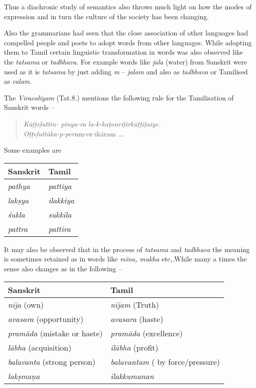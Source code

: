 Thus a diachronic study of semantics also throws much light on how the modes of expression and in turn the culture of the society has been changing.

Also the grammarians had seen that the close association of other languages had compelled people and poets to adopt words from other languages. While adopting them to Tamil certain linguistic transformation in words was also observed like the \textit{tatsama} or \textit{tadbhava}. For example words like \textit{jala} (water) from Sanskrit were used as it is \textit{tatsama} by just adding \textit{m} – \textit{jalam} and also as \textit{tadbhava} or Tamilised as \textit{calam}.

The \textit{Vīracoliyam} (Tat.8.) mentions the following rule for the Tamilisation of Sanskrit words –

\begin{verse}
\textit{Kūṭṭeḻuttin- pinya-ra la-k-kaṭonriṭirkūṭṭiṭaiye.}\\\textit{Oṭṭeḻuttāka-p-per}um-or-ikāram ….
\end{verse}

Some examples are

\begin{longtable}{|l|l|}
\hline
\textbf{Sanskrit} & \textbf{Tamil} \\
\hline
\textit{pathya} & \textit{pattiya} \tabularnewline
\hline
\textit{lakṣya} & \textit{ilakkiya} \tabularnewline
\hline
\textit{śukla} & \textit{sukkila} \tabularnewline
\hline
\textit{pattra} & \textit{pattira} \tabularnewline
\hline
\end{longtable}

It may also be observed that in the process of \textit{tatsama} and \textit{tadbhava} the meaning is sometimes retained as in words like \textit{mīna, mukha} etc,.While many a times the sense also changes as in the following –

\begin{longtable}{|l|l|}
\hline
\textbf{Sanskrit} & \textbf{Tamil} \\
\hline
\textit{nija} (own) & \textit{nijam} (Truth) \tabularnewline
\hline
\textit{avasara} (opportunity) & \textit{avasara} (haste) \tabularnewline
\hline
\textit{pramāda} (mistake or haste) & \textit{pramāda} (excellence) \tabularnewline
\hline
\textit{lābha} (acquisition) & \textit{ilābha} (profit) \tabularnewline
\hline
\textit{balavanta} (strong person) & \textit{balavantam} ( by force/pressure) \tabularnewline
\hline
\textit{lakṣmaṇa} & \textit{ilakkumanan} \tabularnewline
\hline
\end{longtable}

